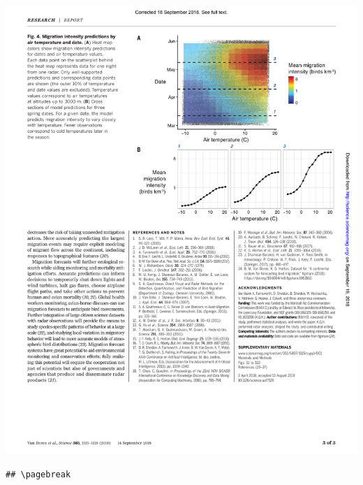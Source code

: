 \documentclass[a4paper, twoside]{templates/ociamthesis}
\begin{document}
\begin{center}\includegraphics[width=1\linewidth]{pdf_chapters/forecast/forecast_crop_Part3} \end{center}

\begin{verbatim}
## \pagebreak
\end{verbatim}
\end{document}
